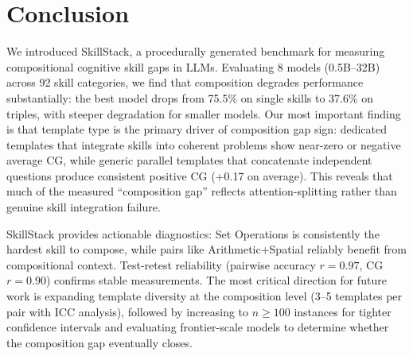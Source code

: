 \documentclass{article}
\begin{document}
\section{Conclusion}
\label{sec:conclusion}

We introduced SkillStack, a procedurally generated benchmark for measuring compositional cognitive skill gaps in LLMs. Evaluating 8 models (0.5B--32B) across 92 skill categories, we find that composition degrades performance substantially: the best model drops from 75.5\% on single skills to 37.6\% on triples, with steeper degradation for smaller models. Our most important finding is that template type is the primary driver of composition gap sign: dedicated templates that integrate skills into coherent problems show near-zero or negative average CG, while generic parallel templates that concatenate independent questions produce consistent positive CG (+0.17 on average). This reveals that much of the measured ``composition gap'' reflects attention-splitting rather than genuine skill integration failure.

SkillStack provides actionable diagnostics: Set Operations is consistently the hardest skill to compose, while pairs like Arithmetic+Spatial reliably benefit from compositional context. Test-retest reliability (pairwise accuracy $r=0.97$, CG $r=0.90$) confirms stable measurements. The most critical direction for future work is expanding template diversity at the composition level (3--5 templates per pair with ICC analysis), followed by increasing to $n \geq 100$ instances for tighter confidence intervals and evaluating frontier-scale models to determine whether the composition gap eventually closes.



\end{document}
